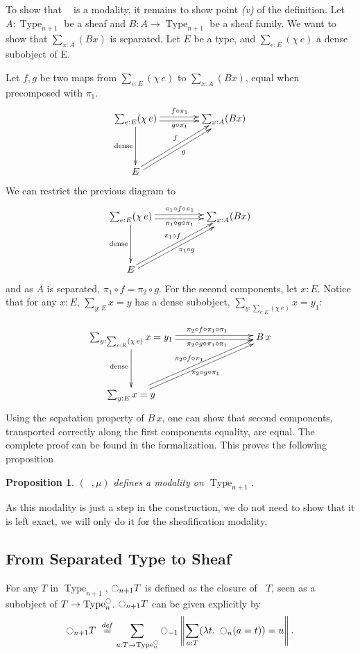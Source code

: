 \documentclass[conference]{IEEEtran}
\newtheorem{prop}[thm]{Proposition}
\newcommand \defeq {\overset{de\hspace{-0.2ex}f}{=}}
\newcommand{\mynote}[2]{
    \fbox{\bfseries\sffamily\scriptsize#1}
    {\small$\blacktriangleright$\textsf{\emph{#2}}$\blacktriangleleft$}~}
\newcommand\nt[1]{\mynote{NT}{#1}}
\DeclareMathOperator{\Type}{Type}
\newcommand{\modal}{\ensuremath{\ocircle}}
\newcommand \separated {\mathop{\square_{n+1}} }
\begin{document}
To show that $\separated$ is a modality, it remains to show point
{\it (v)} of the definition.
%
Let $A:\Type_{n+1}$ be a sheaf and $B:A \to \Type_{n+1}$ be a sheaf
family. We want to show that $\sum_{x:A} (Bx)$ is separated. Let $E$
be a type, and $\sum_{e:E} (\chi\,e)$ a dense subobject of E.

Let $f,g$ be two maps from $\sum_{e:E} (\chi\,e)$ to $\sum_{x:A}
(Bx)$, equal when precomposed with $\pi_1$.
$$\xymatrix @R=4em @C=4em{
  \sum_{e:E} (\chi\, e) \ar@<-2pt>[r]_{g\circ\pi_1} \ar@<2pt>[r]^{f\circ \pi_1} \ar[d]_{\mathrm{dense}}& \sum_{x :A} (Bx) \\
  E \ar@<-2pt>[ru]_{g} \ar@<2pt>[ru]^{f}&
}$$
We can restrict the previous diagram to 
$$\xymatrix @R=4em @C=5em{
  \sum_{e:E} (\chi\, e) \ar@<-2pt>[r]_{\pi_1\circ g\circ\pi_1} \ar@<2pt>[r]^{\pi_1\circ f\circ \pi_1} \ar[d]_{\mathrm{dense}}& \sum_{x :A} (Bx) \\
  E \ar@<-2pt>[ru]_{\pi_1\circ g} \ar@<2pt>[ru]^{\pi_1\circ f}&
}$$
and as $A$ is separated, $\pi_1\circ f = \pi_2 \circ g$.
For the second components, let $x:E$. Notice that for any $x:E$,
$\sum_{y:E} x = y$ has a dense subobject, $\sum_{y:\sum_{e:E} (\chi\,
  e)} x=y_1$:

$$\xymatrix@C=8em@R=4em{
  \sum_{y:\sum_{e:E} (\chi\,
  e)} x=y_1 \ar@<2pt>[r]^{\qquad \pi_2\circ f\circ\pi_1\circ \pi_1}
\ar@<-2pt>[r]_{\qquad \pi_2\circ g\circ \pi_1\circ \pi_1}
\ar[d]_{\mathrm{dense}}& B\,x \\
  \sum_{y:E} x = y \ar@<2pt>[ur]^{\pi_2\circ f\circ \pi_1} \ar@<-2pt>[ur]_{\pi_2\circ g\circ \pi_1}&
}$$
Using the sepatation property of $B\,x$, one can show that second
components, transported correctly along the first components equality,
are equal. The complete proof can be found in the formalization.
This proves the following proposition
\begin{prop}\label{prop:sep-mod}
  $(\separated,\mu)$ defines a modality on $\Type_{n+1}$.
\end{prop}

As this modality is just a step in the construction, we do not need to
show that it is left exact, we will only do it for the sheafification
modality.

\subsection{From Separated Type to Sheaf}
\label{ssec:separated-to-sheaf}

For any $T$ in $\Type_{n+1}$, 
$\modal_{n+1}T$ is defined as the closure of $\separated T$,
seen as a subobject of $T \to \Type_n^\modal$. 
%
$\modal_{n+1}T$ can be given explicitly by
$$
\modal_{n+1} T \ \defeq \sum_{u:T \to \Type_n^\modal} \modal_{-1}\left\| \sum_{a:T} 
            (\lambda t,~\modal_n (a=t)) = u\right\|.
$$
\end{document}
